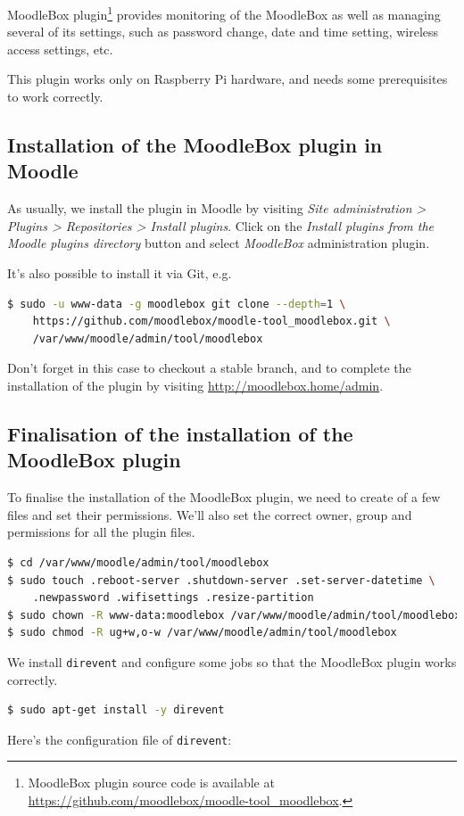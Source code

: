 \documentclass[12pt]{article}
\begin{document}
MoodleBox plugin\footnote{MoodleBox plugin source code is available at \url{https://github.com/moodlebox/moodle-tool_moodlebox}.} provides monitoring of the MoodleBox as well as managing several of its settings, such as password change, date and time setting, wireless access settings, etc.

This plugin works only on Raspberry Pi hardware, and needs some prerequisites to work correctly.

\subsection{Installation of the MoodleBox plugin in Moodle}

As usually, we install the plugin in Moodle by visiting \emph{Site administration > Plugins > Repositories > Install plugins}.
Click on the \emph{Install plugins from the Moodle plugins directory} button and select \emph{MoodleBox} administration plugin.

It's also possible to install it via Git, e.g.

\begin{lstlisting}[language=bash]
$ sudo -u www-data -g moodlebox git clone --depth=1 \
    https://github.com/moodlebox/moodle-tool_moodlebox.git \
    /var/www/moodle/admin/tool/moodlebox
\end{lstlisting}

Don't forget in this case to checkout a stable branch, and to complete the installation of the plugin by visiting \url{http://moodlebox.home/admin}.

\subsection{Finalisation of the installation of the MoodleBox plugin}

To finalise the installation of the MoodleBox plugin, we need to create of a few files and set their permissions.
We'll also set the correct owner, group and permissions for all the plugin files.
\begin{lstlisting}[language=bash]
$ cd /var/www/moodle/admin/tool/moodlebox
$ sudo touch .reboot-server .shutdown-server .set-server-datetime \
    .newpassword .wifisettings .resize-partition
$ sudo chown -R www-data:moodlebox /var/www/moodle/admin/tool/moodlebox
$ sudo chmod -R ug+w,o-w /var/www/moodle/admin/tool/moodlebox
\end{lstlisting}

We install \lstinline{direvent} and configure some jobs so that the MoodleBox plugin works correctly.
\begin{lstlisting}[language=bash]
$ sudo apt-get install -y direvent
\end{lstlisting}
Here's the configuration file of \lstinline{direvent}:

\end{document}
